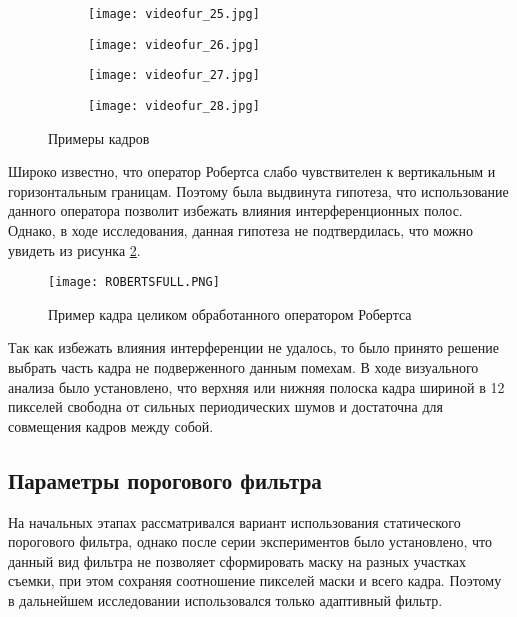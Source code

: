 \begin{figure}[h]
    \centering
    \begin{subfigure}{\textwidth}  
        \centering
        \texttt{[image: videofur\_25.jpg]}
        \smallskip 
    \end{subfigure}    
     \begin{subfigure}{\textwidth}  
        \centering
        \texttt{[image: videofur\_26.jpg]}        
        \smallskip 
    \end{subfigure}
     \begin{subfigure}{\textwidth}  
        \centering
        \texttt{[image: videofur\_27.jpg]}        
        \smallskip 
    \end{subfigure}
     \begin{subfigure}{\textwidth}  
        \centering
        \texttt{[image: videofur\_28.jpg]}
    \end{subfigure}

        \caption{Примеры кадров}
        \label{fig:semple}
\end{figure}

Широко известно, что оператор Робертса слабо чувствителен к вертикальным и горизонтальным границам. Поэтому была выдвинута гипотеза, что использование данного оператора позволит избежать влияния интерференционных полос. Однако, в ходе исследования, данная гипотеза не подтвердилась, что можно увидеть из рисунка \ref{fig:robertsComp}.
\begin{figure}
    \centering   
    \texttt{[image: ROBERTSFULL.PNG]} 
    \caption{Пример кадра целиком обработанного оператором Робертса}
    \label{fig:robertsComp}
\end{figure}
Так как избежать влияния интерференции не удалось, то было принято решение выбрать часть кадра не подверженного данным помехам. В ходе визуального анализа было установлено, что верхняя или нижняя полоска кадра шириной в 12 пикселей свободна от сильных периодических шумов и достаточна для совмещения кадров между собой. 
\subsection{Параметры порогового фильтра}
На начальных этапах рассматривался вариант использования статического порогового фильтра, однако после серии экспериментов было установлено, что данный вид фильтра не позволяет сформировать маску на разных участках съемки, при этом сохраняя соотношение пикселей маски и всего кадра. Поэтому в дальнейшем исследовании использовался только адаптивный фильтр.

